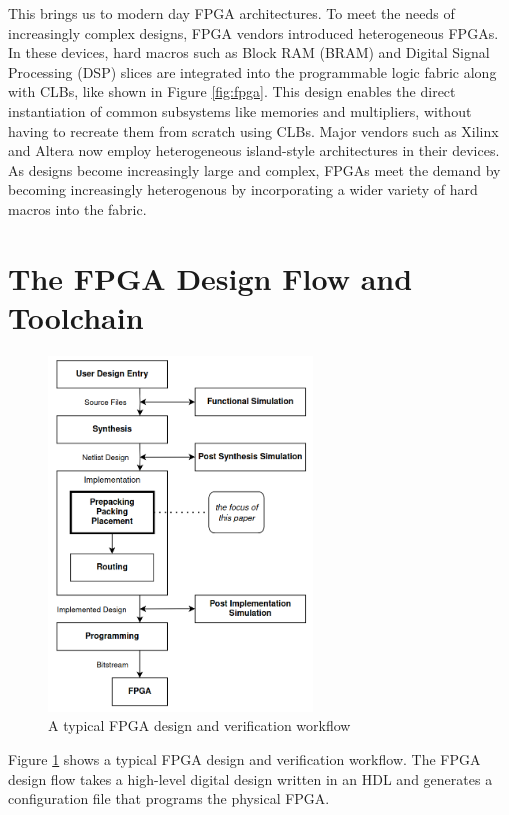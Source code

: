 \documentclass[twocolumn]{article}
\begin{document}
    This brings us to modern day FPGA architectures.
    To meet the needs of increasingly complex designs, FPGA vendors introduced heterogeneous FPGAs. 
    In these devices, hard macros such as Block RAM (BRAM) and Digital Signal Processing (DSP) slices are integrated into the programmable logic fabric along with CLBs, like shown in Figure \ref{fig:fpga}. 
    This design enables the direct instantiation of common subsystems like memories and multipliers, without having to recreate them from scratch using CLBs. 
    Major vendors such as Xilinx and Altera now employ heterogeneous island-style architectures in their devices. 
    As designs become increasingly large and complex, FPGAs meet the demand by becoming increasingly heterogenous by incorporating a wider variety of hard macros into the fabric.

\section{The FPGA Design Flow and Toolchain}
    
    \begin{figure}
        \centering
        \includegraphics[width=7.0cm]{figures/design_flow.png}
        \caption{A typical FPGA design and verification workflow}
        \label{fig:design_flow}
    \end{figure}

    Figure \ref{fig:design_flow} shows a typical FPGA design and verification workflow.
    The FPGA design flow takes a high-level digital design written in an HDL and generates a configuration file that programs the physical FPGA. 
\end{document}

